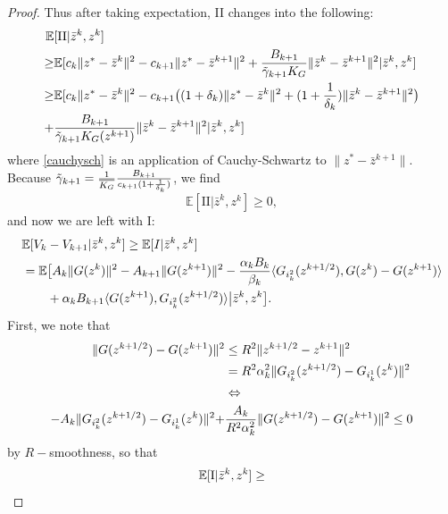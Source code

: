 \documentclass[11pt,reqno,oneside]{amsart}
\theoremstyle{definition}
\numberwithin{equation}{section}
\begin{document}
\begin{proof}
    Thus after taking expectation, II changes into the following:
    \begin{align}
        \mathbb{E}&[\text{II} |\bar{z}^{k},z^{k}] \\
        \geq &\mathbb{E}[c_{k}\|z^{*} - \bar{z}^{k}\|^{2} - c_{k+1}\|z^{*} - \bar{z}^{k+1}\|^{2} + \frac{B_{k+1}}{\Tilde{\gamma}_{k+1}K_{G}}\|\bar{z}^{k}-\bar{z}^{k+1}\|^{2}|\bar{z}^{k},z^{k}] \\
        \geq &\mathbb{E}[c_{k}\|z^{*} - \bar{z}^{k}\|^{2} - c_{k+1}\big{(}(1 + \delta_{k})\|z^{*} - \bar{z}^{k}\|^{2} + (1+\frac{1}{\delta_{k}})\|\bar{z}^{k} - \bar{z}^{k+1}\|^{2}\big{)} \notag \\
        + &\frac{B_{k+1}}{\Tilde{\gamma}_{k+1}K_{G}(z^{k+1})}\|\bar{z}^{k}-\bar{z}^{k+1}\|^{2} |\bar{z}^{k},z^{k}] \label{cauchysch}
    \end{align}
    where \eqref{cauchysch} is an application of Cauchy-Schwartz to $\|z^{*} - \bar{z}^{k+1}\|$.
    Because \newline $\Tilde{\gamma}_{k+1} = \frac{1}{\overline{K_{G}}}\frac{B_{k+1}}{c_{k+1}(1+\frac{1}{\delta_{k}})}$, we find
    \[
        \mathbb{E}[\text{II}|\bar{z}^{k},z^{k}] \geq 0,
    \]
    and now we are left with I:
    \begin{align*}
        \mathbb{E}[V_{k} &- V_{k+1}|\bar{z}^{k},z^{k}] \geq \mathbb{E}[I|\bar{z}^{k},z^{k}]\\
        =\mathbb{E}&\big{[} A_{k}\|G(z^{k})\|^{2} - A_{k+1}\|G(z^{k+1})\|^{2} - \frac{\alpha_{k}B_{k}}{\beta_{k}}\langle G_{i_{k}^{2}}(z^{k+1/2}),G(z^{k}) - G(z^{k+1}) \rangle \\
        & + \alpha_{k}B_{k+1}\langle G(z^{k+1}),G_{i_{k}^{2}}(z^{k+1/2}) \rangle \big{|} \bar{z}^{k}, z^{k} \big{]}.
    \end{align*}
    First, we note that 
    \begin{align}
        \|G(z^{k+1/2}) - G(z^{k+1})\|^{2} &\leq R^{2} \|z^{k+1/2} - z^{k+1}\|^{2} \notag \\
        &= R^{2} \alpha_{k}^2\|G_{i_{k}^{2}}(z^{k+1/2}) - G_{i_{k}^{1}}(z^{k})\|^{2} \\
        & \Leftrightarrow \notag \\
        -A_{k} \|G_{i_{k}^{2}}(z^{k+1/2}) - G_{i_{k}^{1}}(z^{k})\|^{2} + &\frac{A_{k}}{R^{2}\alpha_{k}^{2}}\|G(z^{k+1/2}) - G(z^{k+1})\|^{2} \leq 0 \label{R_smooth_stoch}
    \end{align}
    by $R-$smoothness, so that
    \begin{align}
        \mathbb{E}[\text{I}|&\bar{z}^{k},z^{k}] \geq \notag \\

\end{align}
\end{proof}
\end{document}
